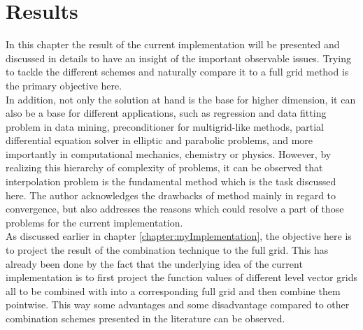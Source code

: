 \chapter{Results}
\label{chapter:results}
In this chapter the result of the current implementation will be presented and discussed in details to have an insight of the important observable issues. Trying to tackle the different schemes and naturally compare it to a full grid method is the primary objective here. \\


In addition, not only the solution at hand is the base for higher dimension, it can also be a base for different applications, such as regression and data fitting problem in data mining, preconditioner for multigrid-like methods, partial differential equation solver in elliptic and parabolic problems, and more importantly in computational mechanics, chemistry or physics. However, by realizing this hierarchy of complexity of problems, it can be observed that interpolation problem is the fundamental method which is the task discussed here. The author acknowledges the drawbacks of method mainly in regard to convergence, but also addresses the reasons which could resolve a part of those problems for the current implementation.\\

As discussed earlier in chapter \ref{chapter:myImplementation}, the objective here is to project the result of the combination technique to the full grid. This has already been done by the fact that the underlying idea of the current implementation is to first project the function values of different level vector grids all to be combined with into a corresponding full grid and then combine them pointwise. This way some advantages and some disadvantage compared to other combination schemes presented in the literature can be observed. \\

